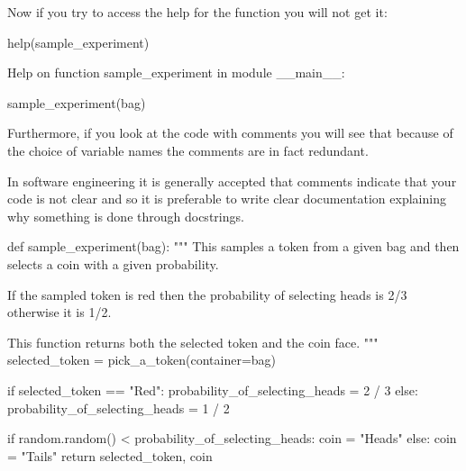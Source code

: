 Now if you try to access the help for the function you will not get it:




\begin{pyin}
help(sample_experiment)
\end{pyin}





\begin{raw}
Help on function sample_experiment in module __main__:

sample_experiment(bag)
\end{raw}


Furthermore, if you look at the code with comments you will see that because of
the choice of variable names the comments are in fact redundant.

In software engineering it is generally accepted that comments indicate that
your code is not clear and so it is preferable to write clear documentation
explaining why something is done through docstrings.

\begin{pyin}
def sample_experiment(bag):
    """
    This samples a token from a given bag and then
    selects a coin with a given probability.

    If the sampled token is red then the probability
    of selecting heads is 2/3 otherwise it is 1/2.

    This function returns both the selected token
    and the coin face.
    """
    selected_token = pick_a_token(container=bag)

    if selected_token == "Red":
        probability_of_selecting_heads = 2 / 3
    else:
        probability_of_selecting_heads = 1 / 2

    if random.random() < probability_of_selecting_heads:
        coin = "Heads"
    else:
        coin = "Tails"
    return selected_token, coin
\end{pyin}
